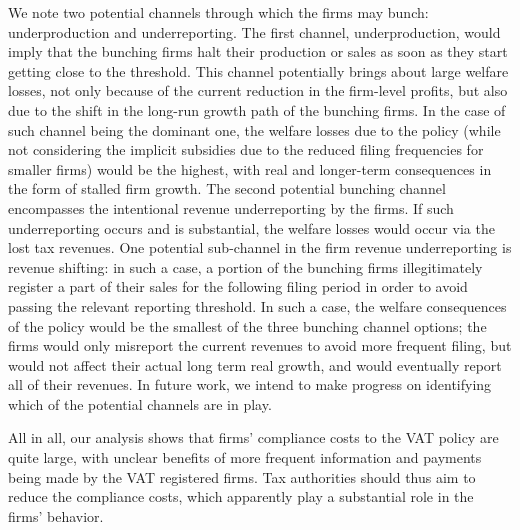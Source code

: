 We note two potential channels through which the firms may bunch: underproduction and underreporting. The first channel, underproduction, would imply that the bunching firms halt their production or sales as soon as they start getting close to the threshold. This channel potentially brings about large welfare losses, not only because of the current reduction in the firm-level profits, but also due to the shift in the long-run growth path of the bunching firms. In the case of such channel being the dominant one, the welfare losses due to the policy (while not considering the implicit subsidies due to the reduced filing frequencies for smaller firms) would be the highest, with real and longer-term consequences in the form of stalled firm growth. The second potential bunching channel encompasses the intentional revenue underreporting by the firms. If such underreporting occurs and is substantial, the welfare losses would occur via the lost tax revenues. One potential sub-channel in the firm revenue underreporting is revenue shifting: in such a case, a portion of the bunching firms illegitimately register a part of their sales for the following filing period in order to avoid passing the relevant reporting threshold. In such a case, the welfare consequences of the policy would be the smallest of the three bunching channel options; the firms would only misreport the current revenues to avoid more frequent filing, but would not affect their actual long term real growth, and would eventually report all of their revenues. In future work, we intend to make progress on identifying which of the potential channels are in play.


All in all, our analysis shows that firms' compliance costs to the VAT policy are quite large, with unclear benefits of more frequent information and payments being made by the VAT registered firms. Tax authorities should thus aim to reduce the compliance costs, which apparently play a substantial role in the firms' behavior. 